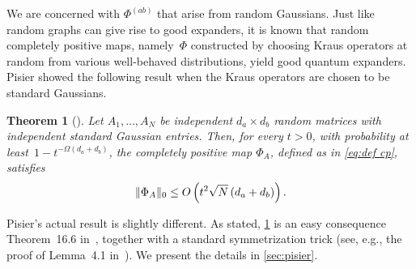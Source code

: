 \documentclass[aos]{imsart}
\newtheorem{theorem}{Theorem}[section]
\theoremstyle{definition}
\numberwithin{equation}{section}
\DeclarePairedDelimiter{\norm}{\lVert}{\rVert}
\begin{document}
We are concerned with $\Phi^{(ab)}$ that arise from random Gaussians.
Just like random graphs can give rise to good expanders, it is known that random completely positive maps, namely~$\Phi$ constructed by choosing Kraus operators at random from various well-behaved distributions, yield good quantum expanders.
Pisier showed the following result when the Kraus operators are chosen to be standard Gaussians.


\begin{theorem}[\cite{pisier2012grothendieck,P14}]\label{thm:hess-pisier}
Let $A_1,\dots,A_N$ be independent $d_a\times d_b$ random matrices with independent standard Gaussian entries.
Then, for every $t >0$, with probability at least~$1 - t^{-\Omega(d_a + d_b)}$, the completely positive map $\Phi_A$, defined as in \cref{eq:def cp}, satisfies
\begin{align*}
  \norm{\Phi_A}_0 \leq O\left(t^{2} \sqrt N \left( d_a + d_b \right)\right).
\end{align*}
\end{theorem}

Pisier's actual result is slightly different.
As stated, \cref{thm:hess-pisier} is an easy consequence Theorem~16.6 in~\cite{pisier2012grothendieck}, together with a standard symmetrization trick (see, e.g., the proof of Lemma~4.1 in~\cite{P14}).
We present the details in \cref{sec:pisier}.
\end{document}
